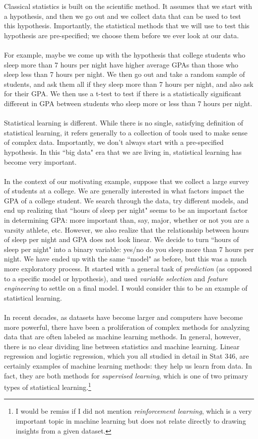 \documentclass[titlepage,10pt]{scrartcl}
\begin{document}
Classical statistics is built on the scientific method. It assumes that we start with a hypothesis, and then we go out and we collect data that can be used to test this hypothesis. Importantly, the statistical methods that we will use to test this hypothesis are pre-specified; we choose them before we ever look at our data. \\
\\
For example, maybe we come up with the hypothesis that college students who sleep more than 7 hours per night have higher average GPAs than those who sleep less than 7 hours per night. We then go out and take a random sample of students, and ask them all if they sleep more than 7 hours per night, and also ask for their GPA. We then use a t-test to test if there is a statistically significant different in GPA between students who sleep more or less than 7 hours per night. \\
\\
Statistical learning is different. While there is no single, satisfying definition of statistical learning, it refers generally to a collection of tools used to make sense of complex data. Importantly, we don't always start with a pre-specified hypothesis. In this ``big data" era that we are living in, statistical learning has become very important. \\
\\
In the context of our motivating example, suppose that we collect a large survey of students at a college. We are generally interested in what factors impact the GPA of a college student. We search through the data, try different models, and end up realizing that ``hours of sleep per night" seems to be an important factor in determining GPA: more important than, say, major, whether or not you are a varsity athlete, etc. However, we also realize that the relationship between hours of sleep per night and GPA does not look linear. We decide to turn ``hours of sleep per night" into a binary variable: yes/no do you sleep more than 7 hours per night. We have ended up with the same ``model" as before, but this was a much more exploratory process. It started with a general task of \emph{prediction} (as opposed to a specific model or hypothesis), and used \emph{variable selection} and \emph{feature engineering} to settle on a final model. I would consider this to be an example of statistical learning. \\
\\
In recent decades, as datasets have become larger and computers have become more powerful, there have been a proliferation of complex methods for analyzing data that are often labeled as machine learning methods. In general, however, there is no clear dividing line between statistics and machine learning. Linear regression and logistic regression, which you all studied in detail in Stat 346, are certainly examples of machine learning methods: they help us learn from data. In fact, they are both methods for \emph{supervised learning}, which is one of two primary types of statistical learning.\footnote{I would be remiss if I did not mention \emph{reinforcement learning}, which is a very important topic in machine learning but does not relate directly to drawing insights from a given dataset.}  
\end{document}
